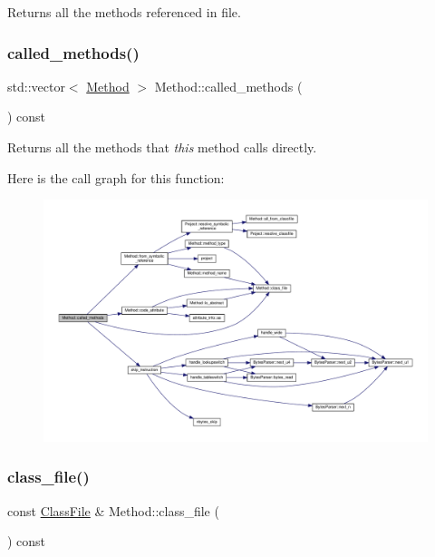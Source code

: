 Returns all the methods referenced in {\ttfamily file}. 

\mbox{\label{classMethod_a378e12e19cf0c8f21bfc13071382d15e}} 
\subsubsection{\texorpdfstring{called\+\_\+methods()}{called\_methods()}}
{\footnotesize\ttfamily std\+::vector$<$ \hyperlink{classMethod}{Method} $>$ Method\+::called\+\_\+methods (\begin{DoxyParamCaption}{ }\end{DoxyParamCaption}) const}



Returns all the methods that {\itshape this} method calls directly. 

Here is the call graph for this function\+:
\nopagebreak
\begin{figure}[H]
\begin{center}
\leavevmode
\includegraphics[width=350pt]{classMethod_a378e12e19cf0c8f21bfc13071382d15e_cgraph}
\end{center}
\end{figure}
\mbox{\label{classMethod_ac6eecb9ebb1eb23098c8556752353a81}} 
\subsubsection{\texorpdfstring{class\+\_\+file()}{class\_file()}}
{\footnotesize\ttfamily const \hyperlink{classfile_8h_a00b46b60bc40e813e9fb1bb049174346}{Class\+File} \& Method\+::class\+\_\+file (\begin{DoxyParamCaption}{ }\end{DoxyParamCaption}) const}



